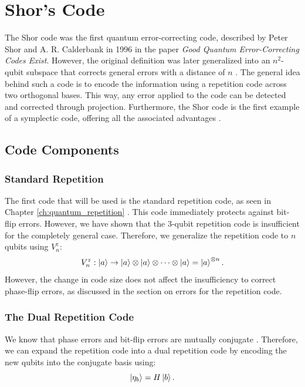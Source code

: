 \chapter{Shor's Code}

The Shor code was the first quantum error-correcting code, described by Peter Shor and A. R. Calderbank in 1996 in the paper \textit{Good Quantum Error-Correcting Codes Exist}. However, the original definition was later generalized into an $n^2$-qubit subspace that corrects general errors with a distance of $n$ \citep{Cesar2024}. The general idea behind such a code is to encode the information using a repetition code across two orthogonal bases. This way, any error applied to the code can be detected and corrected through projection. Furthermore, the Shor code is the first example of a symplectic code, offering all the associated advantages \citep{Kitaev2002}.

\section{Code Components}

\subsection{Standard Repetition}

The first code that will be used is the standard repetition code, as seen in Chapter \ref{ch:quantum_repetition} \citep{Kitaev2002}. This code immediately protects against bit-flip errors. However, we have shown that the $3$-qubit repetition code is insufficient for the completely general case. Therefore, we generalize the repetition code to $n$ qubits using $V^z_n$:
\begin{equation}
  V_n^z : \ket{a} \to \ket{a} \otimes \ket{a} \otimes \dots \otimes \ket{a} = \ket{a}^{\otimes n}
  \label{eq:repetition_n}
.\end{equation}
\citep{Cesar2024}
However, the change in code size does not affect the insufficiency to correct phase-flip errors, as discussed in the section on errors for the repetition code.

\subsection{The Dual Repetition Code}

We know that phase errors and bit-flip errors are mutually conjugate \citep{Kitaev2002}. Therefore, we can expand the repetition code into a dual repetition code by encoding the new qubits into the conjugate basis using:
\begin{equation}
  \ket{\eta_b} = H \ket{b}
  \label{eq:hadamard_encode}
.\end{equation}

